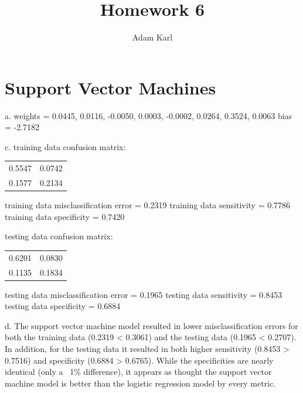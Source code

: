 \documentclass[a4paper]{article}
\title{Homework 6}
\author{Adam Karl}
\begin{document}
\maketitle

\section{Support Vector Machines}

a.
\newline\noindent
weights =     0.0445, 0.0116, -0.0050, 0.0003, -0.0002, 0.0264, 0.3524, 0.0063
\newline\noindent
bias = -2.7182

\medskip\noindent
c.
\newline\noindent
training data confusion matrix:
\begin{table}[htb]
\begin{tabular}{ll}
0.5547 & 0.0742 \\
0.1577 & 0.2134
\end{tabular}
\end{table}
\newline\noindent
training data misclassification error = 0.2319
\newline\noindent
training data sensitivity = 0.7786
\newline\noindent
training data specificity = 0.7420

\newline\noindent
testing data confusion matrix:
\begin{table}[htb]
\begin{tabular}{ll}
0.6201 & 0.0830 \\
0.1135 & 0.1834
\end{tabular}
\end{table}
\newline\noindent
testing data misclassification error = 0.1965
\newline\noindent
testing data sensitivity = 0.8453
\newline\noindent
testing data specificity = 0.6884

\medskip\noindent
d. The support vector machine model resulted in lower misclassification errors for both the training data (0.2319 < 0.3061) and the testing data (0.1965 < 0.2707). In addition, for the testing data it resulted in both higher sensitivity (0.8453 > 0.7516) and specificity (0.6884 > 0.6765). While the specificities are nearly identical (only a ~1\% difference), it appears as thought the support vector machine model is better than the logistic regression model by every metric.
\end{document}

